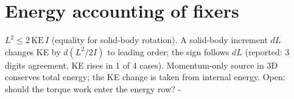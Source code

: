 \section{Energy accounting of fixers}
$L^2\le 2\,\mathrm{KE}\,I$ (equality for solid-body rotation). A solid-body increment $dL$ changes KE by
$d(L^2/2I)$ to leading order; the sign follows $dL$ (reported: 3 digits agreement, KE rises in 1 of 4 cases).
Momentum-only source in 3D conserves total energy; the KE change is taken from internal energy. Open: should the
torque work enter the energy row? \hyp
